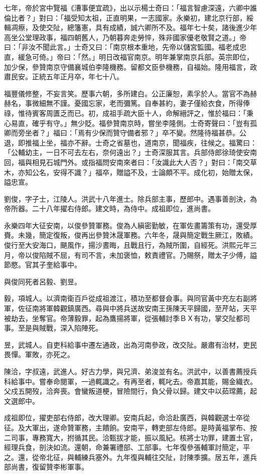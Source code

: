 \begin{pinyinscope}
七年，帝於宮中覽福《漕事便宜疏》，出以示楊士奇曰：「福言智慮深遠，六卿中誰倫比者？」對曰：「福受知太祖，正直明果，一志國家。永樂初，建北京行部，綏輯凋瘵，及使交阯，總籓憲，具有成績，誠六卿所不及。福年七十矣，諸後進少年高坐公堂理政事，福四朝舊人，乃朝暮奔走勞悴，殊非國家優老敬賢之道。」帝曰：「非汝不聞此言。」士奇又曰：「南京根本重地，先帝以儲宮監國。福老成忠直，緩急可倚。」帝曰：「然。」明日改福官南京。明年兼掌南京兵部。英宗即位，加少保，參贊南京守備襄城伯李隆機務。留都文臣參機務，自福始。隆用福言，政肅民安。正統五年正月卒，年七十八。

福豐儀修整，不妄言笑。歷事六朝，多所建白。公正廉恕，素孚於人。當官不為赫赫名，事微細無不謹。憂國忘家，老而彌篤。自奉甚約，妻子僅給衣食，所得俸祿，惟待賓客周匱乏而已。初，成祖手疏大臣十人，命解縉評之，惟於福曰：「秉心易直，確乎有守。」無少貶。福參贊南京時，嘗坐李隆側。士奇寄聲曰：「豈有孤卿而旁坐者？」福曰：「焉有少保而贊守備者邪？」卒不變。然隆待福甚恭。公退，即推福上坐，福亦不辭。士奇之省墓也，道南京，聞福疾，往候之。福驚曰：「公輔幼主，一日不可去左右，奈何遠出？」士奇深服其言。兵部侍郎徐琦使安南回，福與相見石城門外。或指福問安南來者曰：「汝識此大人否？」對曰：「南交草木，亦知公名，安得不識？」福卒，贈謚不及，士論頗不平。成化初，始贈太保，謚忠宣。

劉俊，字子士，江陵人。洪武十八年進士。除兵部主事，歷郎中。遇事善剖決，為帝所器。二十八年擢右侍郎。建文時，為侍中。成祖即位，進尚書。

永樂四年大征安南，以俊參贊軍務。俊為人縝密勤敏，在軍佐畫籌策有功，還受厚賚。未幾，簡定復叛，俊再出參贊沐晟軍務。六年冬，晟與簡定戰生厥江，敗績。俊行至大安海口，颶風作，揚沙晝晦，且戰且行，為賊所圍，自經死。洪熙元年三月，帝以俊陷賊不屈，有司不言，未加褒恤，敕責禮官。乃賜祭，贈太子少傅，謚節愍。官其子奎給事中。

與俊同死者呂毅、劉昱。

毅，項城人。以濟南衛百戶從成祖渡江，積功至都督僉事。與同官黃中充左右副將軍，佐征南將軍韓觀鎮廣西。尋與中將兵送故安南王孫陳天平歸國，至芹站，天平被劫去，坐奪官。帝薄毅罪，起為鷹揚將軍，從張輔討季ＢＸ有功，掌交阯都司事。至是與賊戰，深入陷陣死。

昱，武城人。自吏科給事中遷左通政，出為河南參政，改交阯。嚴肅有治材，吏民畏憚。軍敗，亦死之。

陳洽，字叔遠，武進人。好古力學，與兄濟、弟浚並有名。洪武中，以善書薦授兵科給事中。嘗奉命閱軍，一過輒識之。有再至者，輒叱去。帝嘉其能，賜金織衣。父戍五開歿，洽奔喪。會蠻叛道梗，冒險間行，負父骨以歸。建文中以茹瑺薦，起文選郎中。

成祖即位，擢吏部右侍郎，改大理卿。安南兵起，命洽赴廣西，與韓觀選士卒從征。及大軍出，遂命贊軍務，主饋餉。安南平，轉吏部左侍郎。是時黃福掌布、按二司事，專務寬大，拊循其民。洽甄拔才能，振以風紀。核將士功罪，建置土官，經理兵食，剖決如流。還朝，命兼署禮部、工部事。七年復參張輔軍討簡定，平之。還，從帝北征，與輔練兵塞外。九年復與輔往交阯，討陳季擴。居五年，進兵部尚書，復留贊李彬軍事。


\end{pinyinscope}
